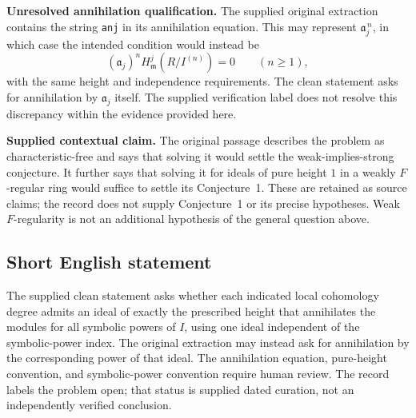 \documentclass[11pt]{article}
\begin{document}
\textbf{Unresolved annihilation qualification.} The supplied original extraction contains the string \texttt{anj} in its annihilation equation. This may represent \(\mathfrak a_j^{\,n}\), in which case the intended condition would instead be
\[
 (\mathfrak a_j)^n H^j_{\mathfrak m}(R/I^{(n)})=0
 \qquad(n\geq1),
\]
with the same height and independence requirements. The clean statement asks for annihilation by \(\mathfrak a_j\) itself. The supplied verification label does not resolve this discrepancy within the evidence provided here.

\textbf{Supplied contextual claim.} The original passage describes the problem as characteristic-free and says that solving it would settle the weak-implies-strong conjecture. It further says that solving it for ideals of pure height \(1\) in a weakly \(F\)-regular ring would suffice to settle its Conjecture~1. These are retained as source claims; the record does not supply Conjecture~1 or its precise hypotheses. Weak \(F\)-regularity is not an additional hypothesis of the general question above.
\subsection{Short English statement}
The supplied clean statement asks whether each indicated local cohomology degree admits an ideal of exactly the prescribed height that annihilates the modules for all symbolic powers of \(I\), using one ideal independent of the symbolic-power index. The original extraction may instead ask for annihilation by the corresponding power of that ideal. The annihilation equation, pure-height convention, and symbolic-power convention require human review. The record labels the problem open; that status is supplied dated curation, not an independently verified conclusion.
\end{document}
